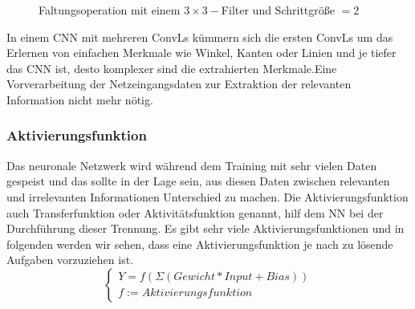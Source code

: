 \documentclass[12pt,a4paper]{scrartcl}
\numberwithin{equation}{section}
\begin{document}
\begin{figure}[h]
	
	\caption{Faltungsoperation mit einem $ 3\times 3 -$Filter und Schrittgröße $ =2 $}
	\label{Faltungsoperation2}
\end{figure}

In einem \ac{CNN} mit mehreren \acsp{ConvL} kümmern sich die ersten \acsp{ConvL} um das Erlernen von einfachen Merkmale wie Winkel, Kanten oder Linien und je tiefer das \ac{CNN} ist, desto komplexer sind die extrahierten Merkmale.Eine Vorverarbeitung der Netzeingangsdaten zur Extraktion der relevanten Information nicht mehr nötig. \\


\subsubsection{Aktivierungsfunktion}
Das neuronale Netzwerk wird während dem Training mit sehr vielen Daten gespeist und das sollte in der Lage sein, aus diesen Daten zwischen relevanten und irrelevanten Informationen Unterschied zu machen.
Die Aktivierungsfunktion auch Transferfunktion oder Aktivitätsfunktion genannt, hilf dem \ac{NN} bei der Durchführung dieser Trennung. Es gibt sehr viele Aktivierungsfunktionen und in folgenden werden wir sehen, dass eine Aktivierungsfunktion je nach zu lösende Aufgaben  vorzuziehen ist.\[\begin{cases}
Y = f(\Sigma (Gewicht*Input + Bias))\\ f:= Aktivierungsfunktion
\end{cases} \]
\end{document}
